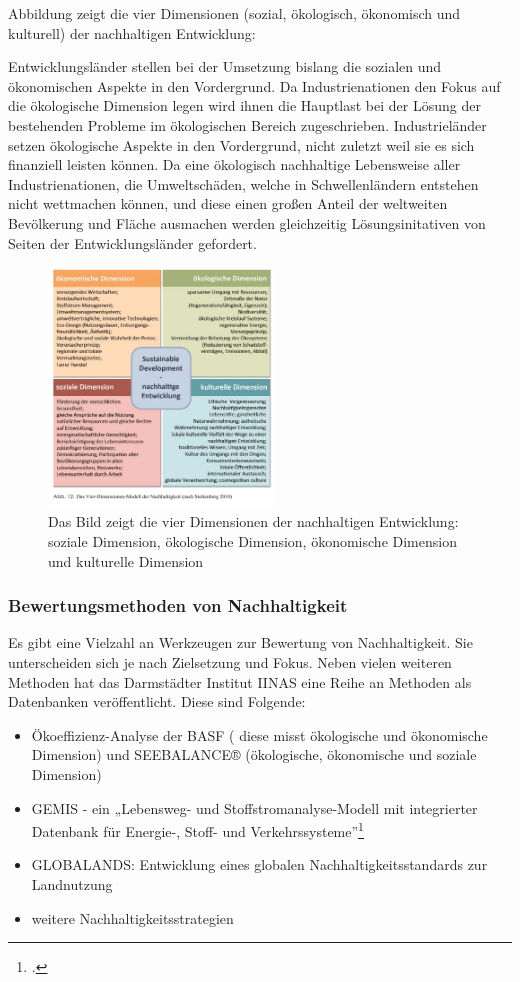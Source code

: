 \documentclass{scrartcl}
\begin{document}
Abbildung \label{fig:4-dimensionen Modell} zeigt die vier Dimensionen (sozial, ökologisch, ökonomisch und kulturell) der nachhaltigen Entwicklung: 

Entwicklungsländer stellen bei der Umsetzung bislang die sozialen und ökonomischen Aspekte in den Vordergrund. Da Industrienationen den Fokus auf die ökologische Dimension legen wird ihnen die Hauptlast bei der Lösung der bestehenden Probleme im ökologischen Bereich zugeschrieben. Industrieländer setzen ökologische Aspekte in den Vordergrund, nicht zuletzt weil sie es sich finanziell leisten können. Da eine ökologisch nachhaltige Lebensweise aller Industrienationen, die Umweltschäden, welche in Schwellenländern entstehen nicht wettmachen können, und diese einen großen Anteil der weltweiten Bevölkerung und Fläche ausmachen werden gleichzeitig Lösungsinitativen von Seiten der Entwicklungsländer gefordert.

\begin{figure}[h]
\centering
\includegraphics[width=6cm]{image_folder/vierdimensionenmodell_der_N.png}
\caption{Das Bild zeigt die vier Dimensionen der nachhaltigen Entwicklung: soziale Dimension, ökologische Dimension, ökonomische Dimension und kulturelle Dimension}
\label{fig:4-dimensionen Modell}
\end{figure}


\subsubsection{Bewertungsmethoden von Nachhaltigkeit}
Es gibt eine Vielzahl an Werkzeugen zur Bewertung von Nachhaltigkeit. Sie unterscheiden sich je nach Zielsetzung und Fokus. Neben vielen weiteren Methoden hat das Darmstädter Institut IINAS eine Reihe an Methoden als Datenbanken veröffentlicht. Diese sind Folgende:

\begin{itemize}
\item Ökoeffizienz-Analyse der BASF ( diese misst ökologische und ökonomische Dimension) und SEEBALANCE® (ökologische, ökonomische und soziale Dimension)
\item GEMIS - ein „Lebensweg- und Stoffstromanalyse-Modell mit integrierter Datenbank für Energie-, Stoff- und Verkehrssysteme”\footcite{}
\item GLOBALANDS: Entwicklung eines globalen Nachhaltigkeitsstandards zur Landnutzung
\item weitere Nachhaltigkeitsstrategien
\end{itemize}
\end{document}
